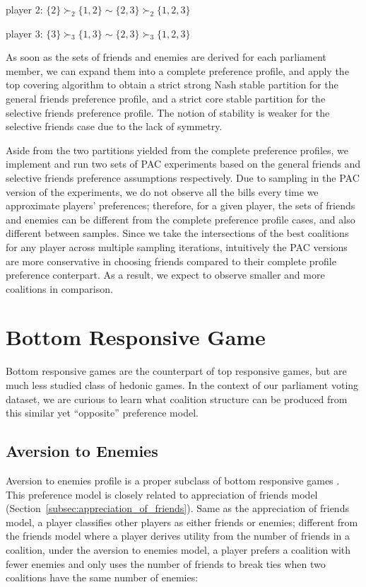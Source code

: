 player 2: $\{2\} \succ_2 \{1, 2\} \sim \{2, 3\} \succ_2 \{1, 2, 3\} $

player 3: $\{3\} \succ_3 \{1, 3\} \sim \{2, 3\} \succ_3 \{1, 2, 3\}$

As soon as the sets of friends and enemies are derived for each parliament member,
we can expand them into a complete preference profile, and apply the top covering
algorithm to obtain a strict strong Nash stable partition for the general friends
preference profile, and a strict core stable partition for the selective friends
preference profile. The notion of stability is weaker for the selective friends
case due to the lack of symmetry.

Aside from the two partitions yielded from the complete preference profiles,
we implement and run two sets of PAC experiments based on the general friends
and selective friends preference assumptions respectively.
Due to sampling in the PAC version of the experiments, we do not observe all
the bills every time we approximate players' preferences;
therefore, for a given player, the sets of friends and enemies can be different
from the complete preference profile cases, and also different between samples.
Since we take the intersections of the best coalitions for any player across
multiple sampling iterations, intuitively the PAC versions are more conservative
in choosing friends compared to their complete profile preference conterpart.
As a result, we expect to observe smaller and more coalitions in comparison.


\section{Bottom Responsive Game}
\label{sec:bottom_responsive_game}

Bottom responsive games are the counterpart of top responsive games, but are
much less studied class of hedonic games.
In the context of our parliament voting dataset, we are curious to learn what coalition structure can be produced from this similar yet ``opposite''
preference model.

\subsection{Aversion to Enemies}
\label{subsec:aversion_to_enemies}

Aversion to enemies profile is a proper subclass of bottom responsive games
\cite{SuSu10}.
This preference model is closely related to appreciation of friends model
(Section~\ref{subsec:appreciation_of_friends}).
Same as the appreciation of friends model, a player classifies other players as
either friends or enemies; different from the friends model where a player
derives utility from the number of friends in a coalition, under the aversion
to enemies model, a player prefers a coalition with fewer enemies and only uses
the number of friends to break ties when two coalitions have the same number
of enemies:

